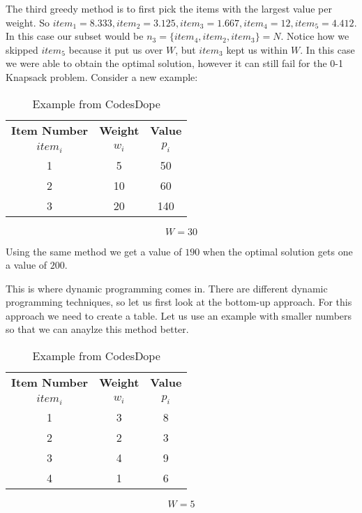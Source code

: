 \forceindent The third greedy method is to first pick the items with the largest value per weight. So $item_1 = 8.333, item_2 = 3.125, item_3 = 1.667 , item_4 = 12, item_5 = 4.412$. In this case our subset would be $n_3 = \{item_4, item_2, item_3\} = N$. Notice how we skipped $item_5$ because it put us over $W$, but $item_3$ kept us within $W$. In this case we were able to obtain the optimal solution, however it can still fail for the 0-1 Knapsack problem. Consider a new example:

\begin{table}[h!]
	\begin{center}
		\caption{Example from CodesDope \cite{noauthor_knapsack_nodate-2}}
		\label{tab:example1.5}
		\begin{tabular}{c|c|c}
			\toprule %
			\textbf{Item Number} & \textbf{Weight} & \textbf{Value}\\
			$item_i$ & $w_i$ & $p_i$ \\
			\midrule %
			1 & 5 & 50 \\
			2 & 10 & 60 \\
			3 & 20 & 140 
		\end{tabular}
	\end{center} \vspace{12pt}
	$$
	W = 30
	$$
\end{table}

Using the same method we get a value of $190$ when the optimal solution gets one a value of $200$. 

\forceindent This is where dynamic programming comes in. There are different dynamic programming techniques, so let us first look at the bottom-up approach. For this approach we need to create a table. Let us use an example with smaller numbers so that we can anaylze this method better.
\newpage
\begin{table}[h!]
	\begin{center}
		\caption{Example from CodesDope \cite{noauthor_knapsack_nodate-2}}
		\label{tab:example2}
		\begin{tabular}{c|c|c}
			\toprule %
			\textbf{Item Number} & \textbf{Weight} & \textbf{Value}\\
			$item_i$ & $w_i$ & $p_i$ \\
			\midrule %
			1 & 3 & 8 \\
			2 & 2 & 3 \\
			3 & 4 & 9 \\
			4 & 1 & 6 
		\end{tabular}
	\end{center} \vspace{12pt}
	$$
	W = 5
	$$
\end{table}

